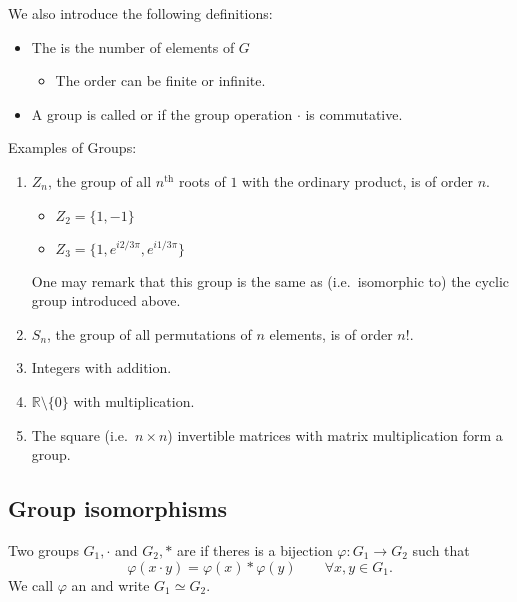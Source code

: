 We also introduce the following definitions:

\begin{definition}
\begin{itemize}
\item The  is the number of elements of $G$
\begin{itemize}
\item The order can be finite or infinite.
\end{itemize}
\item A group is called  or  if the group operation $\boldsymbol{\cdot}$ is commutative.
\end{itemize}
\end{definition}

\begin{example}
Examples of Groups:
\begin{enumerate}
\item $Z_n$, the group of all $n^{\text{th}}$ roots of $1$ with the ordinary product, is of order $n$.
\begin{itemize}
\item $Z_2 = \{1,-1\}$
\item $Z_3 = \{1, e^{i2/3\pi}, e^{i1/3\pi}\}$
\end{itemize}
One may remark that this group is the same as (i.e.\ isomorphic to) the cyclic group introduced above.
\item $S_n$, the group of all permutations of $n$ elements, is of order $n!$.
\item Integers with addition.
\item $\mathbb{R}\setminus\{0\}$ with multiplication.
\item The square (i.e.\ $n\times n$) invertible matrices with matrix multiplication form a group.
\end{enumerate}
\end{example}

\subsection{Group isomorphisms}

\begin{definition}
Two groups $G_1, \cdot$ and $G_2,*$ are  if theres is a bijection $\varphi: G_1 \to G_2$ such that
\[ \varphi(x\cdot y) = \varphi(x)*\varphi(y) \qquad \forall x,y\in G_1.\]
We call $\varphi$ an  and write $G_1 \simeq G_2$.
\end{definition}



